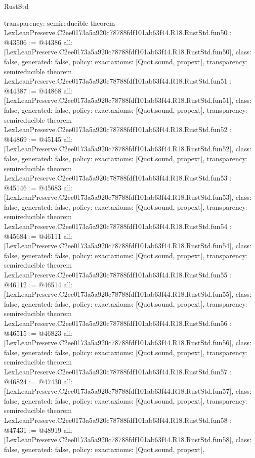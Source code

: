\begin{lexlean}{RustStd}
\begin{coremodule}
{  transparency: semireducible
}
theorem LexLeanPreserve.C2ee0173a5a920c78788fdf101ab63f44.R18.RustStd.fun50 : @43506 := @44386 {
  all: [LexLeanPreserve.C2ee0173a5a920c78788fdf101ab63f44.R18.RustStd.fun50],
  class: false,
  generated: false,
  policy: exact{axioms: [Quot.sound, propext]},
  transparency: semireducible
}
theorem LexLeanPreserve.C2ee0173a5a920c78788fdf101ab63f44.R18.RustStd.fun51 : @44387 := @44868 {
  all: [LexLeanPreserve.C2ee0173a5a920c78788fdf101ab63f44.R18.RustStd.fun51],
  class: false,
  generated: false,
  policy: exact{axioms: [Quot.sound, propext]},
  transparency: semireducible
}
theorem LexLeanPreserve.C2ee0173a5a920c78788fdf101ab63f44.R18.RustStd.fun52 : @44869 := @45145 {
  all: [LexLeanPreserve.C2ee0173a5a920c78788fdf101ab63f44.R18.RustStd.fun52],
  class: false,
  generated: false,
  policy: exact{axioms: [Quot.sound, propext]},
  transparency: semireducible
}
theorem LexLeanPreserve.C2ee0173a5a920c78788fdf101ab63f44.R18.RustStd.fun53 : @45146 := @45683 {
  all: [LexLeanPreserve.C2ee0173a5a920c78788fdf101ab63f44.R18.RustStd.fun53],
  class: false,
  generated: false,
  policy: exact{axioms: [Quot.sound, propext]},
  transparency: semireducible
}
theorem LexLeanPreserve.C2ee0173a5a920c78788fdf101ab63f44.R18.RustStd.fun54 : @45684 := @46111 {
  all: [LexLeanPreserve.C2ee0173a5a920c78788fdf101ab63f44.R18.RustStd.fun54],
  class: false,
  generated: false,
  policy: exact{axioms: [Quot.sound, propext]},
  transparency: semireducible
}
theorem LexLeanPreserve.C2ee0173a5a920c78788fdf101ab63f44.R18.RustStd.fun55 : @46112 := @46514 {
  all: [LexLeanPreserve.C2ee0173a5a920c78788fdf101ab63f44.R18.RustStd.fun55],
  class: false,
  generated: false,
  policy: exact{axioms: [Quot.sound, propext]},
  transparency: semireducible
}
theorem LexLeanPreserve.C2ee0173a5a920c78788fdf101ab63f44.R18.RustStd.fun56 : @46515 := @46823 {
  all: [LexLeanPreserve.C2ee0173a5a920c78788fdf101ab63f44.R18.RustStd.fun56],
  class: false,
  generated: false,
  policy: exact{axioms: [Quot.sound, propext]},
  transparency: semireducible
}
theorem LexLeanPreserve.C2ee0173a5a920c78788fdf101ab63f44.R18.RustStd.fun57 : @46824 := @47430 {
  all: [LexLeanPreserve.C2ee0173a5a920c78788fdf101ab63f44.R18.RustStd.fun57],
  class: false,
  generated: false,
  policy: exact{axioms: [Quot.sound, propext]},
  transparency: semireducible
}
theorem LexLeanPreserve.C2ee0173a5a920c78788fdf101ab63f44.R18.RustStd.fun58 : @47431 := @48919 {
  all: [LexLeanPreserve.C2ee0173a5a920c78788fdf101ab63f44.R18.RustStd.fun58],
  class: false,
  generated: false,
  policy: exact{axioms: [Quot.sound, propext]},
}
\end{coremodule}
\end{lexlean}
